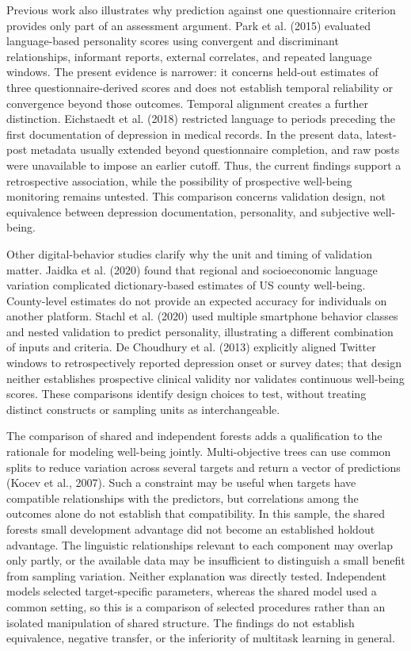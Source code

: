 \documentclass[11pt,letterpaper]{article}
\begin{document}
Previous work also illustrates why prediction against one questionnaire criterion provides only part of an assessment argument. Park et al. (2015) evaluated language-based personality scores using convergent and discriminant relationships, informant reports, external correlates, and repeated language windows. The present evidence is narrower: it concerns held-out estimates of three questionnaire-derived scores and does not establish temporal reliability or convergence beyond those outcomes. Temporal alignment creates a further distinction. Eichstaedt et al. (2018) restricted language to periods preceding the first documentation of depression in medical records. In the present data, latest-post metadata usually extended beyond questionnaire completion, and raw posts were unavailable to impose an earlier cutoff. Thus, the current findings support a retrospective association, while the possibility of prospective well-being monitoring remains untested. This comparison concerns validation design, not equivalence between depression documentation, personality, and subjective well-being.

Other digital-behavior studies clarify why the unit and timing of validation matter. Jaidka et al. (2020) found that regional and socioeconomic language variation complicated dictionary-based estimates of US county well-being. County-level estimates do not provide an expected accuracy for individuals on another platform. Stachl et al. (2020) used multiple smartphone behavior classes and nested validation to predict personality, illustrating a different combination of inputs and criteria. De Choudhury et al. (2013) explicitly aligned Twitter windows to retrospectively reported depression onset or survey dates; that design neither establishes prospective clinical validity nor validates continuous well-being scores. These comparisons identify design choices to test, without treating distinct constructs or sampling units as interchangeable.

The comparison of shared and independent forests adds a qualification to the rationale for modeling well-being jointly. Multi-objective trees can use common splits to reduce variation across several targets and return a vector of predictions (Kocev et al., 2007). Such a constraint may be useful when targets have compatible relationships with the predictors, but correlations among the outcomes alone do not establish that compatibility. In this sample, the shared forest\textquotesingle s small development advantage did not become an established holdout advantage. The linguistic relationships relevant to each component may overlap only partly, or the available data may be insufficient to distinguish a small benefit from sampling variation. Neither explanation was directly tested. Independent models selected target-specific parameters, whereas the shared model used a common setting, so this is a comparison of selected procedures rather than an isolated manipulation of shared structure. The findings do not establish equivalence, negative transfer, or the inferiority of multitask learning in general.
\end{document}
